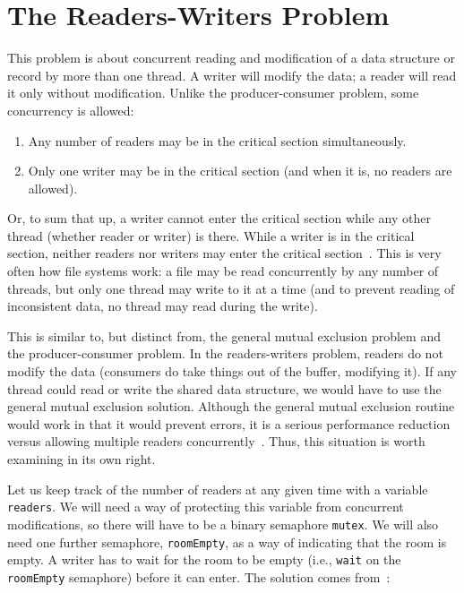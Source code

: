 




\section*{The Readers-Writers Problem}

This problem is about concurrent reading and modification of a data structure or record by more than one thread. A writer will modify the data; a reader will read it only without modification. Unlike the producer-consumer problem, some concurrency is allowed:

\begin{enumerate}
	\item Any number of readers may be in the critical section simultaneously.
	\item Only one writer may be in the critical section (and when it is, no readers are allowed).
\end{enumerate}

Or, to sum that up, a writer cannot enter the critical section while any other thread (whether reader or writer) is there. While a writer is in the critical section, neither readers nor writers may enter the critical section~\cite{lbs}. This is very often how file systems work: a file may be read concurrently by any number of threads, but only one thread may write to it at a time (and to prevent reading of inconsistent data, no thread may read during the write).

This is similar to, but distinct from, the general mutual exclusion problem and the producer-consumer problem. In the readers-writers problem, readers do not modify the data (consumers do take things out of the buffer, modifying it). If any thread could read or write the shared data structure, we would have to use the general mutual exclusion solution. Although the general mutual exclusion routine would work in that it would prevent errors, it is a serious performance reduction versus allowing multiple readers concurrently~\cite{osi}. Thus, this situation is worth examining in its own right.

Let us keep track of the number of readers at any given time with a variable \texttt{readers}. We will need a way of protecting this variable from concurrent modifications, so there will have to be a binary semaphore \texttt{mutex}. We will also need one further semaphore, \texttt{roomEmpty}, as a way of indicating that the room is empty. A writer has to wait for the room to be empty (i.e., \texttt{wait} on the \texttt{roomEmpty} semaphore) before it can enter. The solution comes from~\cite{lbs}:

